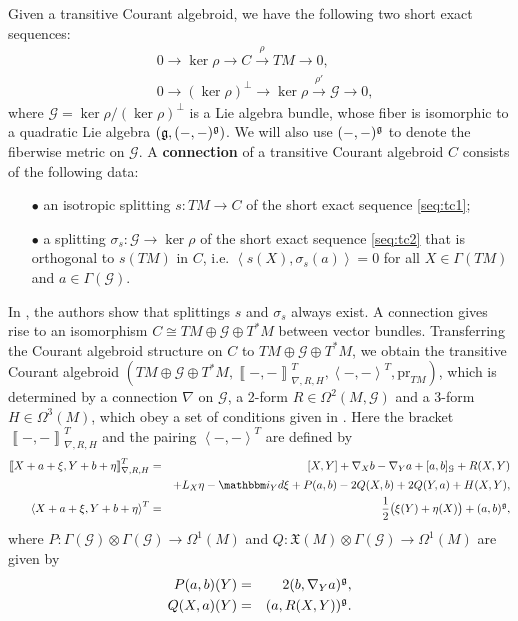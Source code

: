 \documentclass[letterpaper,10pt, oneside]{article} %
\newcommand{\ii}{\mathbbm i}
\newcommand{\huaG}{\mathcal{G}}
\newcommand{\frkX}{\mathfrak X}
\newcommand{\half}{\frac{1}{2}}
\newcommand{\pair}[1]{\left\langle #1\right\rangle}
\newcommand{\Courant}[1]{\left\llbracket  #1\right\rrbracket }
\newcommand{\pr}{\mathrm{pr}}
\begin{document}
Given a transitive Courant algebroid, we have the following two short exact sequences:
\begin{eqnarray}
  \label{seq:tc1}&0\longrightarrow\ker\rho\longrightarrow C\stackrel{\rho}{\longrightarrow}TM\longrightarrow 0,\\
 \label{seq:tc2} &0\longrightarrow(\ker\rho)^\bot\longrightarrow \ker\rho\stackrel{\rho'}{\longrightarrow}\huaG\longrightarrow 0,
\end{eqnarray}
where  $\huaG=\ker\rho/(\ker\rho)^\bot$ is a Lie algebra bundle, whose fiber is isomorphic to a quadratic Lie algebra $(\mathfrak g,(-,-)^\mathfrak g)$. We will also use $(-,-)^\mathfrak g$ to denote the fiberwise metric on $\huaG$.   A {\bf connection} of a transitive Courant algebroid $C$ consists of the following data:
 \begin{itemize}
   \item[$\bullet$] an isotropic splitting $s:TM\longrightarrow C$ of the short exact sequence \eqref{seq:tc1};
   \item[$\bullet$] a splitting $\sigma_s:\huaG\longrightarrow\ker\rho$ of the short exact sequence \eqref{seq:tc2} that is orthogonal to $s(TM)$ in $C$, i.e. $\pair{s(X),\sigma_s(a)}=0$ for all $X\in \Gamma(TM)$ and $a\in \Gamma(\huaG)$.
 \end{itemize}
 In \cite{ChenRCA}, the authors show that splittings $s$ and $\sigma_s$ always exist. A connection gives rise to an isomorphism $C\cong TM\oplus \huaG\oplus T^*M$ between vector bundles. Transferring the Courant algebroid structure on $C$ to $TM\oplus \huaG\oplus T^*M$, we obtain  the transitive Courant algebroid  $(TM\oplus \huaG\oplus T^*M,\Courant{-,-}^T_{\nabla,R,H},\pair{-,-}^T,\pr_{TM})$, which is determined by a connection $\nabla$ on $\huaG$, a  2-form $R \in \Omega^2(M, \huaG)$ and a 3-form $H\in \Omega^3(M)$, which obey a set of conditions given in \cite[Propositoin 2.2]{ChenRCA}. Here the bracket $\Courant{-,-}^T_{\nabla,R,H}$ and the pairing $\pair{-,-}^T$ are defined by
\begin{eqnarray}
    \nonumber\Courant{X+a+\xi,Y+b+\eta}^T_{\nabla,R,H}&=&[X,Y]+\nabla_Xb-\nabla_Ya+[a,b]_\huaG+R(X,Y)\\
  &&\label{eq:Tbracket}+L_X\eta-\ii_Yd\xi+P(a,b)-2Q(X,b)+2Q(Y,a)+H(X,Y),\\
  \label{eq:Tpair} \pair{X+a+\xi,Y+b+\eta}^T&=&\half\big(\xi(Y)+\eta(X)\big)+(a,b)^\g,
\end{eqnarray}
where $P:\Gamma(\huaG)\otimes \Gamma(\huaG)\longrightarrow\Omega^1(M)$ and $Q:\frkX(M)\otimes \Gamma(\huaG)\longrightarrow\Omega^1(M)$ are given by
\begin{eqnarray}
  P(a,b)(Y)&=&2(b,\nabla_Ya)^\mathfrak g,\\
  Q(X,a)(Y)&=&(a,R(X,Y))^\mathfrak g.
\end{eqnarray}
\end{document}
